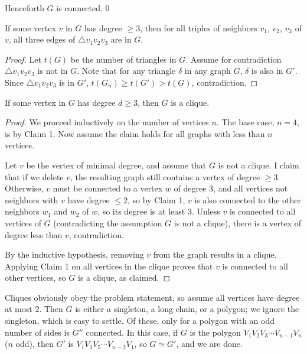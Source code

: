 Henceforth $G$ is connected.
\setcounter{iclaim}0
\begin{iclaim}
    If some vertex $v$ in $G$ has degree $\ge3$, then for all triples of neighbors $v_1$, $v_2$, $v_3$ of $v$, all three edges of $\triangle v_1v_2v_3$ are in $G$.
\end{iclaim}
\begin{proof}
    Let $t(G)$ be the number of triangles in $G$. Assume for contradiction $\triangle v_1v_2v_3$ is not in $G$. Note that for any triangle $\delta$ in any graph $G$, $\delta$ is also in $G'$. Since $\triangle v_1v_2v_3$ is in $G'$, $t(G_n)\ge t(G')>t(G)$, contradiction.
\end{proof}
\begin{iclaim}
    If some vertex in $G$ has degree $d\ge3$, then $G$ is a clique.
\end{iclaim}
\begin{proof}
    We proceed inductively on the number of vertices $n$. The base case, $n=4$, is by Claim 1. Now assume the claim holds for all graphs with less than $n$ vertices.

    Let $v$ be the vertex of minimal degree, and assume that $G$ is not a clique. I claim that if we delete $v$, the resulting graph still contains a vertex of degree $\ge3$. Otherwise, $v$ must be connected to a vertex $w$ of degree $3$, and all vertices not neighbors with $v$ have degree $\le2$, so by Claim 1, $v$ is also connected to the other neighbors $w_1$ and $w_2$ of $w$, so its degree is at least $3$. Unless $v$ is connected to all vertices of $G$ (contradicting the assumption $G$ is not a clique), there is a vertex of degree less than $v$, contradiction.

    By the inductive hypothesis, removing $v$ from the graph results in a clique. Applying Claim 1 on all vertices in the clique proves that $v$ is connected to all other vertices, so $G$ is a clique, as claimed.
\end{proof}

Cliques obviously obey the problem statement, so assume all vertices have degree at most $2$. Then $G$ is either a singleton, a long chain, or a polygon; we ignore the singleton, which is easy to settle. Of these, only for a polygon with an odd number of sides is $G''$ connected. In this case, if $G$ is the polygon $V_1V_2V_3\cdots V_{n-1}V_n$ ($n$ odd), then $G'$ is $V_1V_3V_5\cdots V_{n-2}V_1$, so $G\simeq G'$, and we are done.

